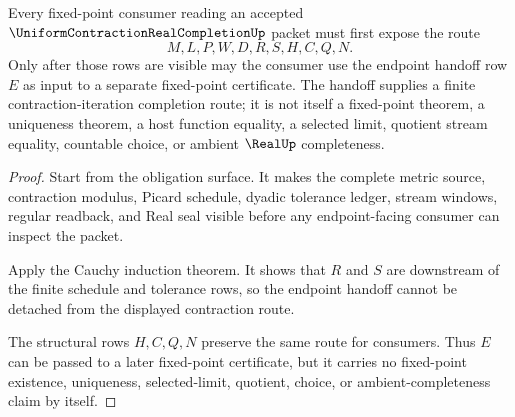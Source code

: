 \begin{theorem}
\label{thm:uniform-contraction-real-completion-fixed-point-handoff}
Every fixed-point consumer reading an accepted $\UniformContractionRealCompletionUp$ packet must first expose the route
$$
M,L,P,W,D,R,S,H,C,Q,N .
$$
Only after those rows are visible may the consumer use the endpoint handoff row $E$ as input to a separate fixed-point certificate. The handoff supplies a finite contraction-iteration completion route; it is not itself a fixed-point theorem, a uniqueness theorem, a host function equality, a selected limit, quotient stream equality, countable choice, or ambient $\RealUp$ completeness.
\end{theorem}
\begin{proof}
Start from the obligation surface. It makes the complete metric source, contraction modulus, Picard schedule, dyadic tolerance ledger, stream windows, regular readback, and Real seal visible before any endpoint-facing consumer can inspect the packet.

Apply the Cauchy induction theorem. It shows that $R$ and $S$ are downstream of the finite schedule and tolerance rows, so the endpoint handoff cannot be detached from the displayed contraction route.

The structural rows $H,C,Q,N$ preserve the same route for consumers. Thus $E$ can be passed to a later fixed-point certificate, but it carries no fixed-point existence, uniqueness, selected-limit, quotient, choice, or ambient-completeness claim by itself.
\end{proof}




